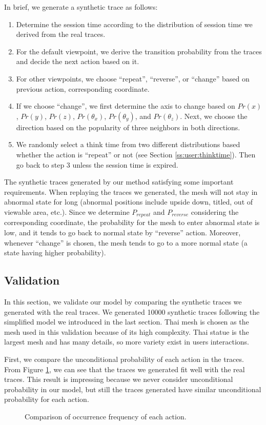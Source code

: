 In brief, we generate a synthetic trace as follows:
\begin{enumerate}
    \item Determine the session time according to the distribution of session time we derived from the real traces.
    \item For the default viewpoint, we derive the transition probability from the traces and decide the
        next action based on it.
    \item For other viewpoints, we choose ``repeat'', ``reverse'', or ``change'' 
        based on {previous action, corresponding coordinate}.
    \item If we choose ``change'', 
        we first determine the axis to change based on $Pr(x)$, $Pr(y)$, $Pr(z)$, 
        $Pr(\theta_x)$, $Pr(\theta_y)$, and $Pr(\theta_z)$. 
        Next, we choose the direction based on the popularity of three
        neighbors in both directions.
    \item We randomly select a think time from two different distributions 
        based whether the action is ``repeat'' or not (see Section \ref{ss:user:thinktime}).
        Then go back to step 3 unless the session time is expired.
\end{enumerate}

The synthetic traces generated by our method satisfying some important requirements. 
When replaying the traces we generated, the mesh will not stay in abnormal state for long 
(abnormal positions include upside down, titled, out of viewable area, etc.).
Since we determine $P_{repeat}$ and $P_{reverse}$ considering the corresponding coordinate,
the probability for the mesh to enter abnormal state is low, and it tends to go back to normal state
by ``reverse'' action. 
Moreover, whenever ``change'' is chosen, 
the mesh tends to go to a more normal state (a state having higher probability). 

\subsection{Validation}
In this section, we validate our model by comparing the synthetic traces we generated with the real traces.
We generated 10000 synthetic traces following the simplified model we introduced in the last section.
Thai mesh is chosen as the mesh used in this validation because of its high complexity. Thai statue 
is the largest mesh and has many details, so more variety exist in users interactions. 

First, we compare the unconditional probability of each action in the traces. 
From Figure \ref{f:user:frequency_comp}, we can see that the traces we generated fit well with the real traces. 
This result is impressing because we never consider unconditional probability in our model, but  
still the traces generated have similar unconditional probability for each action.
\begin{figure}[htdp!]
    \centering
    \caption{Comparison of occurrence frequency of each action.}
    \label{f:user:frequency_comp}
\end{figure}

